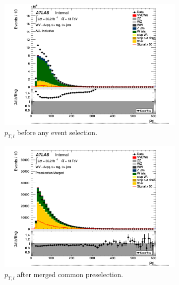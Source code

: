 \begin{figure}[ht]
        \begin{subfigure}{0.3\textwidth}
            \includegraphics[width=\linewidth]{figures/1lep/CRPlots/C_0ptag0pjet_0ptv_ALL_PtL_Lin.png}
            \caption{$p_{T,l}$ before any event selection.}
        \end{subfigure}
        \begin{subfigure}{0.3\textwidth}
            \includegraphics[width=\linewidth]{figures/1lep/CRPlots/C_0ptag0pjet_0ptv_Presel_Merged_PtL_Lin.png}
            \caption{$p_{T,l}$ after merged common preselection.}
        \end{subfigure}
        \begin{subfigure}{0.3\textwidth}

\end{subfigure}
\end{figure}
